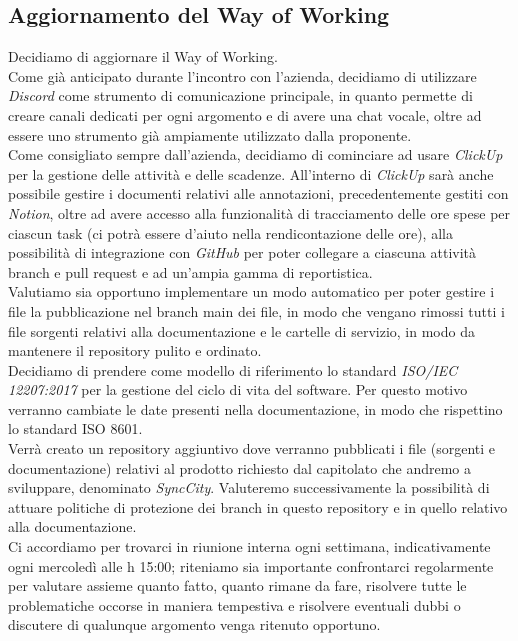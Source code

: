 \documentclass[italian,12pt]{article}
\begin{document}
\subsection{Aggiornamento del Way of Working}
Decidiamo di aggiornare il Way of Working. \\
Come già anticipato durante l'incontro con l'azienda, decidiamo di utilizzare \textit{Discord} 
come strumento di comunicazione principale, in quanto permette di creare canali dedicati 
per ogni argomento e di avere una chat vocale, oltre ad essere uno strumento già ampiamente utilizzato dalla proponente. \\
Come consigliato sempre dall'azienda, decidiamo di cominciare ad usare \textit{ClickUp} 
per la gestione delle attività e delle scadenze. All'interno di \textit{ClickUp} sarà anche possibile 
gestire i documenti relativi alle annotazioni, precedentemente gestiti con \textit{Notion}, 
oltre ad avere accesso alla funzionalità di tracciamento delle ore spese per ciascun task 
(ci potrà essere d'aiuto nella rendicontazione delle ore), alla possibilità di integrazione 
con \textit{GitHub} per poter collegare a ciascuna attività branch e pull request e ad un'ampia gamma di reportistica. \\
Valutiamo sia opportuno implementare un modo automatico per poter gestire i file la pubblicazione nel branch main 
dei file, in modo che vengano rimossi tutti i file sorgenti relativi alla documentazione e le cartelle di servizio, 
in modo da mantenere il repository pulito e ordinato. \\
Decidiamo di prendere come modello di riferimento lo standard \textit{ISO/IEC 12207:2017} per la gestione del ciclo di vita del software. 
Per questo motivo verranno cambiate le date presenti nella documentazione, in modo che rispettino 
lo standard ISO 8601. \\
Verrà creato un repository aggiuntivo dove verranno pubblicati i file (sorgenti e documentazione) relativi al prodotto 
richiesto dal capitolato che andremo a sviluppare, denominato \textit{SyncCity}. Valuteremo successivamente 
la possibilità di attuare politiche di protezione dei branch in questo repository e in quello relativo alla documentazione. \\
Ci accordiamo per trovarci in riunione interna ogni settimana, indicativamente ogni mercoledì alle h 15:00; 
riteniamo sia importante confrontarci regolarmente per valutare assieme quanto fatto, quanto rimane da fare, 
risolvere tutte le problematiche occorse in maniera tempestiva e risolvere eventuali dubbi o discutere di qualunque argomento 
venga ritenuto opportuno.
\end{document}
